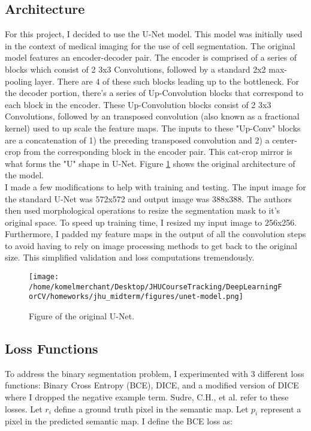\documentclass[Location Location Location! : Exploring Image Segmentation Problem In Urban Driving Scenarios]{IEEEtran}
\begin{document}
\subsection{Architecture}
For this project, I decided to use the U-Net model. This model was initially used in the context of medical imaging for the use of cell segmentation. The original model features an encoder-decoder pair. The encoder is comprised of a series of blocks which consist of 2 3x3 Convolutions, followed by a standard 2x2 max-pooling layer. There are 4 of these such blocks leading up to the bottleneck. For the decoder portion, there's a series of Up-Convolution blocks that correspond to each block in the encoder. These Up-Convolution blocks consist of 2 3x3 Convolutions, followed by an transposed convolution (also known as a fractional kernel) used to up scale the feature maps. The inputs to these "Up-Conv" blocks are a concatenation of 1) the preceding transposed convolution and 2) a center-crop from the corresponding block in the encoder pair. This cat-crop mirror is what forms the "U" shape in U-Net. Figure \ref{unet} shows the original architecture of the model. \\  

I made a few modifications to help with training and testing. The input image for the standard U-Net was 572x572 and output image was 388x388. The authors then used morphological operations to resize the segmentation mask to it's original space. To speed up training time, I resized my input image to 256x256. Furthermore, I padded my feature maps in the output of all the convolution steps to avoid having to rely on image processing methods to get back to the original size. This simplified validation and loss computations tremendously. 


\begin{figure}[htbp]
\centerline{\texttt{[image: /home/komelmerchant/Desktop/JHUCourseTracking/DeepLearningForCV/homeworks/jhu\_midterm/figures/unet-model.png]}}
\caption{Figure of the original U-Net.}
\label{unet}
\end{figure}


\subsection{Loss Functions}

To address the binary segmentation problem, I experimented with 3 different loss functions: Binary Cross Entropy (BCE), DICE, and a modified version of DICE where I dropped the negative example term. Sudre, C.H., et al. \cite{gen-dice} refer to these losses. Let $r_i$ define a ground truth pixel in the semantic map. Let $p_i$ represent a pixel in the predicted semantic map. I define the BCE loss as: 
\end{document}
